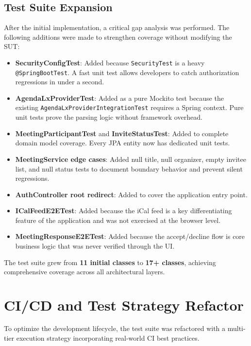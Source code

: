 \documentclass[11pt]{article}
\begin{document}
  \subsection{Test Suite Expansion}
  After the initial implementation, a critical gap analysis was performed. The following additions were made to strengthen coverage without modifying the SUT:
  \begin{itemize}
    \item \textbf{SecurityConfigTest}: Added because \texttt{SecurityTest} is a heavy \texttt{@SpringBootTest}. A fast unit test allows developers to catch authorization regressions in under a second.
    \item \textbf{AgendaLxProviderTest}: Added as a pure Mockito test because the existing \texttt{AgendaLxProviderIntegrationTest} requires a Spring context. Pure unit tests prove the parsing logic without framework overhead.
    \item \textbf{MeetingParticipantTest} and \textbf{InviteStatusTest}: Added to complete domain model coverage. Every JPA entity now has dedicated unit tests.
    \item \textbf{MeetingService edge cases}: Added null title, null organizer, empty invitee list, and null status tests to document boundary behavior and prevent silent regressions.
    \item \textbf{AuthController root redirect}: Added to cover the application entry point.
    \item \textbf{ICalFeedE2ETest}: Added because the iCal feed is a key differentiating feature of the application and was not exercised at the browser level.
    \item \textbf{MeetingResponseE2ETest}: Added because the accept/decline flow is core business logic that was never verified through the UI.
  \end{itemize}
  The test suite grew from \textbf{11 initial classes} to \textbf{17+ classes}, achieving comprehensive coverage across all architectural layers.

  \section{CI/CD and Test Strategy Refactor}
  To optimize the development lifecycle, the test suite was refactored with a multi-tier execution strategy incorporating real-world CI best practices.
\end{document}
